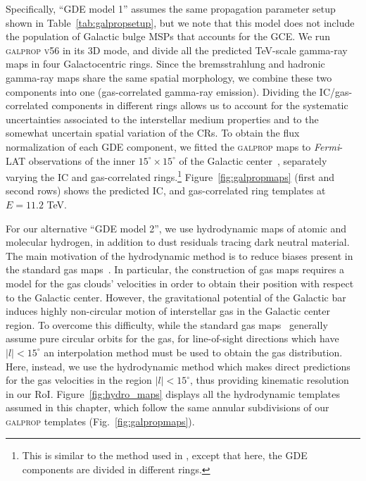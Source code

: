 \documentclass[doublespace,nopageskip]{VTthesis} %
\begin{document}
Specifically, ``GDE model 1'' assumes the same propagation parameter setup shown in Table~\ref{tab:galpropsetup}, but we note that this model does not include the population of Galactic bulge MSPs that accounts for the GCE. We run \textsc{galprop v56} in its 3D mode, and divide all the predicted TeV-scale gamma-ray maps in four Galactocentric rings. Since the bremsstrahlung and hadronic gamma-ray maps share the same spatial morphology, we combine these two components into one (gas-correlated gamma-ray emission). Dividing the IC/gas-correlated components in different rings allows us to account for the systematic uncertainties associated to the interstellar medium properties and to the somewhat uncertain spatial variation of the CRs. 
To obtain the flux normalization of each GDE component, we fitted the \textsc{galprop} maps to \textit{Fermi}-LAT observations of the inner $15^\circ \times 15^\circ$ of the Galactic center~\citep{2018NatAs...2..387M}, separately varying the IC and gas-correlated rings.\footnote{This is similar to the method used in \cite{2021PhRvD.103b3011R}, except that here, the GDE components are divided in different rings.} Figure~\ref{fig:galpropmaps} (first and second rows) shows the predicted IC, and gas-correlated ring templates at $E=11.2$ TeV. 

For our alternative ``GDE model 2'', we use hydrodynamic maps of atomic and molecular hydrogen, in addition to dust residuals tracing dark neutral material. The main motivation of the hydrodynamic method is to reduce biases present in the standard gas maps~\citep{2012ApJ...750....3A}. In particular, the construction of gas maps requires a model for the gas clouds' velocities in order to obtain their position with respect to the Galactic center. 
However, the gravitational potential of the Galactic bar induces highly non-circular motion of interstellar gas in the Galactic center region. 
%
To overcome this difficulty, while the standard gas maps~\citep{2012ApJ...750....3A} generally assume pure circular orbits for the gas, for line-of-sight directions which have $\lvert l \rvert < 15^\circ $ an interpolation method must be used to obtain the gas distribution. 
%
Here, instead, we use the hydrodynamic method \citep{2008ApJ...677..283P,2018NatAs...2..387M} which makes direct predictions for the gas velocities in the region $\lvert l \rvert < 15^\circ $, thus providing kinematic resolution in our RoI. Figure~\ref{fig:hydro_maps} displays all the hydrodynamic templates assumed in this chapter, which follow the same annular subdivisions of our \textsc{galprop} templates (Fig.~\ref{fig:galpropmaps}).
\end{document}
